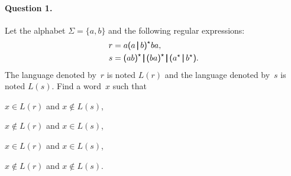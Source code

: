\paragraph{Question 1.}

Let the alphabet \(\Sigma = \{a, b\}\) and the following regular
expressions:
\begin{align*}
  r &= a \textsf{(} a \, \pmb{\lvert}{} \, b \textsf{)}^{\star}{} ba,\\
  s &= \textsf{(} ab \textsf{)}^{\star}{} \, \pmb{\lvert}{} \, \textsf{(} ba
  \textsf{)}^{\star}{} \, \pmb{\lvert}{} \, \textsf{(} a^{\star}{} 
  \, \pmb{\lvert}{} \, b^{\star}\textsf{)}.
\end{align*}
The language denoted by~\(r\) is noted \(L(r)\) and the language
denoted by~\(s\) is noted \(L(s)\). Find a word~\(x\) such that
\begin{enumerate*}

  \item \(x \in L(r)\) and \(x \not\in L(s)\),

  \item \(x \not\in L(r)\) and \(x \in L(s)\),

  \item \(x \in L(r)\) and \(x \in L(s)\),

  \item \(x \not\in L(r)\) and \(x \not\in L(s)\).

\end{enumerate*}

